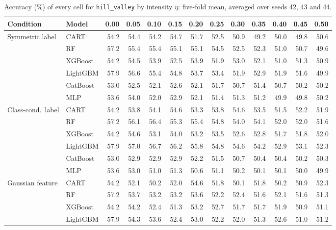 \documentclass[pdflatex,sn-mathphys]{sn-jnl}
\theoremstyle{thmstyleone}
\begin{document}
\begin{table}[htbp]
\centering
\tiny
\setlength{\tabcolsep}{2.6pt}
\caption{Accuracy (\%) of every cell for \texttt{hill\_valley} by intensity $\eta$: five-fold mean, averaged over seeds 42, 43 and 44.}
\label{tab:grid_hill_valley}
\begin{tabular}{@{}llrrrrrrrrrrr@{}}
\toprule
Condition & Model & 0.00 & 0.05 & 0.10 & 0.15 & 0.20 & 0.25 & 0.30 & 0.35 & 0.40 & 0.45 & 0.50 \\
\midrule
Symmetric label & CART & 54.2 & 54.4 & 54.2 & 54.7 & 51.7 & 52.5 & 50.9 & 49.2 & 50.0 & 49.8 & 50.6 \\
 & RF & 57.2 & 55.4 & 55.4 & 55.1 & 55.1 & 54.5 & 52.5 & 52.3 & 51.0 & 50.7 & 49.6 \\
 & XGBoost & 54.2 & 54.5 & 53.9 & 52.5 & 53.9 & 51.9 & 53.0 & 52.1 & 51.0 & 51.3 & 50.9 \\
 & LightGBM & 57.9 & 56.6 & 55.4 & 54.8 & 53.7 & 53.4 & 51.9 & 52.9 & 51.9 & 51.6 & 49.9 \\
 & CatBoost & 53.0 & 52.5 & 52.1 & 52.6 & 52.1 & 51.7 & 50.7 & 51.4 & 50.7 & 50.2 & 50.2 \\
 & MLP & 53.6 & 54.0 & 52.0 & 52.9 & 52.1 & 51.4 & 51.3 & 51.2 & 49.9 & 49.8 & 50.2 \\
\midrule
Class-cond.\ label & CART & 54.2 & 53.8 & 54.1 & 54.6 & 53.3 & 53.8 & 54.6 & 53.5 & 51.5 & 52.2 & 51.9 \\
 & RF & 57.2 & 56.1 & 56.4 & 55.3 & 55.4 & 54.8 & 54.0 & 54.1 & 52.0 & 52.0 & 51.6 \\
 & XGBoost & 54.2 & 54.6 & 53.1 & 54.0 & 53.2 & 53.5 & 52.6 & 52.8 & 51.7 & 51.8 & 52.0 \\
 & LightGBM & 57.9 & 57.0 & 56.7 & 56.2 & 55.8 & 54.8 & 54.6 & 54.2 & 52.9 & 53.1 & 52.3 \\
 & CatBoost & 53.0 & 52.9 & 52.9 & 52.9 & 52.2 & 51.5 & 50.7 & 50.4 & 50.4 & 50.2 & 50.3 \\
 & MLP & 53.6 & 53.0 & 51.0 & 51.3 & 50.6 & 51.1 & 50.2 & 50.1 & 50.1 & 50.0 & 49.9 \\
\midrule
Gaussian feature & CART & 54.2 & 52.1 & 50.2 & 52.0 & 54.6 & 51.8 & 50.1 & 51.8 & 50.2 & 50.9 & 52.3 \\
 & RF & 57.2 & 53.7 & 53.2 & 53.2 & 53.6 & 52.2 & 52.4 & 51.6 & 52.1 & 51.6 & 51.3 \\
 & XGBoost & 54.2 & 54.2 & 52.4 & 51.3 & 53.2 & 52.7 & 51.7 & 51.7 & 51.9 & 50.9 & 51.1 \\
 & LightGBM & 57.9 & 54.3 & 53.6 & 52.4 & 53.0 & 52.2 & 52.0 & 51.3 & 52.6 & 51.0 & 51.2 \\

\end{tabular}
\end{table}
\end{document}
